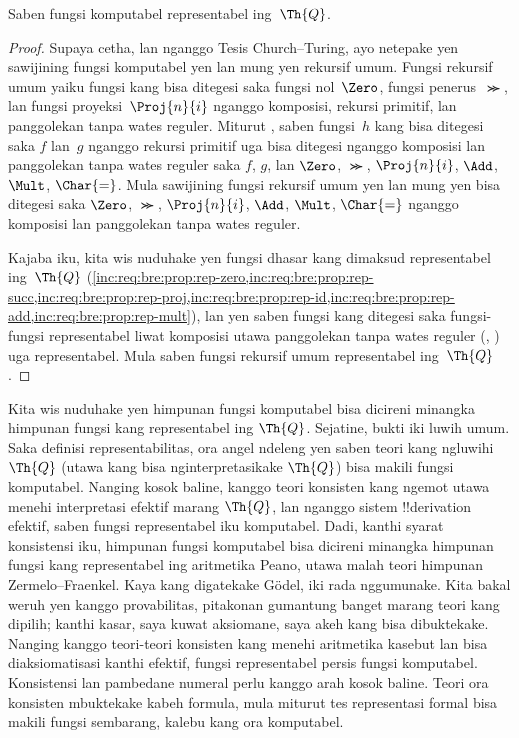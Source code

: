 \documentclass[../../../include/open-logic-section]{subfiles}
\begin{document}

\begin{thm}
Saben fungsi komputabel representabel ing~$\Th{Q}$.
\end{thm}

\begin{proof}
Supaya cetha, lan nganggo Tesis Church--Turing, ayo netepake yen
sawijining fungsi komputabel yen lan mung yen rekursif umum. Fungsi
rekursif umum yaiku fungsi kang bisa ditegesi saka fungsi
nol~$\Zero$, fungsi penerus~$\Succ$, lan fungsi proyeksi~$\Proj{n}{i}$
nganggo komposisi, rekursi primitif, lan panggolekan tanpa wates
reguler. Miturut , saben fungsi~$h$ kang
bisa ditegesi saka $f$ lan~$g$ nganggo rekursi primitif uga bisa ditegesi nganggo komposisi
lan panggolekan tanpa wates reguler saka $f$, $g$, lan $\Zero$,
$\Succ$, $\Proj{n}{i}$, $\Add$, $\Mult$, $\Char{=}$.
Mula sawijining fungsi rekursif umum yen lan mung yen bisa ditegesi
saka $\Zero$, $\Succ$, $\Proj{n}{i}$, $\Add$, $\Mult$, $\Char{=}$ nganggo
komposisi lan panggolekan tanpa wates reguler.

Kajaba iku, kita wis nuduhake yen fungsi dhasar kang dimaksud
representabel ing~$\Th{Q}$
(\cref{inc:req:bre:prop:rep-zero,inc:req:bre:prop:rep-succ,inc:req:bre:prop:rep-proj,inc:req:bre:prop:rep-id,inc:req:bre:prop:rep-add,inc:req:bre:prop:rep-mult}),
lan yen saben fungsi kang ditegesi saka fungsi-fungsi representabel
liwat komposisi utawa panggolekan tanpa wates reguler
(,
) uga representabel. Mula saben
fungsi rekursif umum representabel ing~$\Th{Q}$.
\end{proof}

\begin{explain}
Kita wis nuduhake yen himpunan fungsi komputabel bisa dicireni
minangka himpunan fungsi kang representabel ing $\Th{Q}$. Sejatine,
bukti iki luwih umum. Saka definisi representabilitas, ora angel
ndeleng yen saben teori kang ngluwihi $\Th{Q}$ (utawa kang bisa
nginterpretasikake $\Th{Q}$) bisa makili fungsi
komputabel. Nanging kosok baline, kanggo teori konsisten kang ngemot utawa
menehi interpretasi efektif marang $\Th{Q}$, lan nganggo sistem !!{derivation}
efektif, saben fungsi representabel iku komputabel. Dadi, kanthi
syarat konsistensi iku, himpunan fungsi komputabel bisa dicireni
minangka himpunan fungsi kang representabel ing aritmetika Peano,
utawa malah teori himpunan Zermelo--Fraenkel. Kaya kang digatekake
G\"odel, iki rada nggumunake. Kita bakal weruh yen kanggo provabilitas,
pitakonan gumantung banget marang teori kang dipilih; kanthi kasar,
saya kuwat aksiomane, saya akeh kang bisa dibuktekake. Nanging kanggo
teori-teori konsisten kang menehi aritmetika kasebut lan bisa
diaksiomatisasi kanthi efektif, fungsi representabel persis fungsi
komputabel. Konsistensi lan
pambedane numeral perlu kanggo arah kosok baline. Teori ora konsisten
mbuktekake kabeh formula, mula miturut tes representasi formal bisa
makili fungsi sembarang, kalebu kang ora komputabel.
\end{explain}
\end{document}
